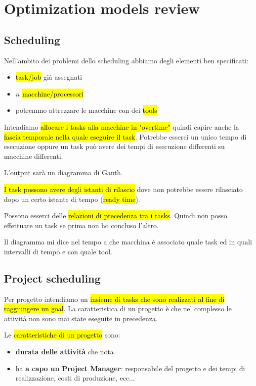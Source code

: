 \newpage
\section{Optimization models review}

\subsection{Scheduling}

Nell'ambito dei problemi dello scheduling abbiamo degli elementi ben specificati:

\begin{itemize}
	\item \hl{task/job} già assegnati
	\item $n$ \hl{macchine/processori}
	\item potremmo attrezzare le macchine con dei \hl{tools}
\end{itemize}

Intendiamo \hl{allocare i tasks alla macchine in "overtime"} quindi capire anche la \hl{fascia temporale nella quale eseguire il task}. Potrebbe esserci un unico tempo di esecuzione oppure un task può avere dei tempi di esecuzione differenti su macchine differenti. 

L'output sarà un diagramma di Ganth.

\hl{I task possono avere degli istanti di rilascio} dove non potrebbe essere rilasciato dopo un certo istante di tempo (\hl{ready time}).

Possono esserci delle \hl{relazioni di precedenza tra i tasks}. Quindi non posso effettuare un task se prima non ho concluso l'altro.

Il diagramma mi dice nel tempo a che macchina è associato quale task ed in quali intervalli di tempo e con quale tool.


\subsection{Project scheduling}

Per progetto intendiamo un \hl{insieme di tasks che sono realizzati al fine di raggiungere un goal}. La caratteristica di un progetto è che nel complesso le attività non sono mai state eseguite in precedenza.

Le \hl{caratteristiche di un progetto} sono:


\begin{itemize}
	\item \textbf{durata delle attività} che nota
	\item ha \textbf{a capo un Project Manager}: responsabile del progetto e dei tempi di realizzazione, costi di produzione, ecc...
\end{itemize}



